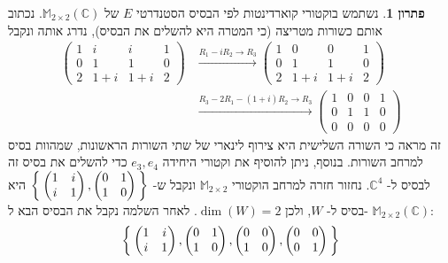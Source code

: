 \documentclass[12pt]{report}
\theoremstyle{plain}
\theoremstyle{definition}
\newtheorem*{solution}{פתרון}
\newcommand{\C}{\mathbb{C}}
\newcommand{\M}{\mathbb{M}}
\newcommand{\0}{\mathbf{0}}
\begin{document}
\begin{solution}
נשתמש בוקטורי קוארדינטות לפי הבסיס הסטנדרטי
$E$
של
$\M_{2\times 2}(\C)$.
נכתוב אותם כשורות מטריצה (כי המטרה היא להשלים את הבסיס), נדרג אותה ונקבל
$$
\begin{aligned}
\begin{pmatrix}
1 & i & i & 1 \\
0 & 1 & 1 & 0 \\
2 & 1+i & 1+i & 2
\end{pmatrix}&\xrightarrow{R_1-iR_2\to R_3}\begin{pmatrix}
1 & 0 & 0 & 1 \\
0 & 1 & 1 & 0 \\
2 & 1+i & 1+i & 2
\end{pmatrix} \\
&\xrightarrow{R_3-2R_1-(1+i)R_2\to R_3}\begin{pmatrix}
1 & 0 & 0 & 1 \\
0 & 1 & 1 & 0 \\
0 & 0 & 0 & 0
\end{pmatrix}
\end{aligned}
$$
זה מראה כי השורה השלישית היא צירוף לינארי של שתי השורות הראשונות, שמהוות בסיס למרחב השורות. בנוסף, ניתן להוסיף את וקטורי היחידה 
$e_3,e_4$
כדי להשלים את בסיס זה לבסיס ל-
$\C^4$.
נחזור חזרה למרחב הוקטורי
$\M_{2\times 2}$
ונקבל ש-
$\Set{\begin{pmatrix}
1 & i \\
i & 1
\end{pmatrix},\begin{pmatrix}
0 & 1 \\
1 & 0
\end{pmatrix}}$
היא בסיס ל-
$W$,
ולכן
$\dim(W)=2$.
לאחר השלמה נקבל את הבסיס הבא ל-
$\M_{2\times 2}(\C)$:
$$
\Set{\begin{pmatrix}
1 & i \\
i & 1
\end{pmatrix},\begin{pmatrix}
0 & 1 \\
1 & 0
\end{pmatrix},\begin{pmatrix}
0 & 0 \\
1 & 0
\end{pmatrix},\begin{pmatrix}
0 & 0 \\
0 & 1
\end{pmatrix}}
$$
\end{solution}
\end{document}
